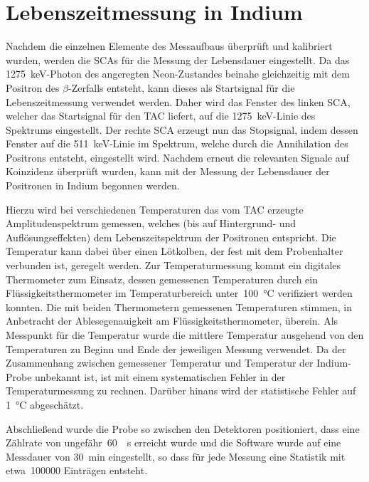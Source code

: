 \documentclass[11pt, a4paper]{article}
\numberwithin{equation}{section}
\begin{document}
\clearpage
\section{Lebenszeitmessung in Indium}
Nachdem die einzelnen Elemente des Messaufbaus überprüft und kalibriert wurden, werden die SCAs für die Messung der Lebensdauer eingestellt.
Da das \SI{1275}{\keV}-Photon des angeregten Neon-Zustandes beinahe gleichzeitig mit dem Positron des $\beta$-Zerfalls entsteht, kann dieses als Startsignal für die Lebenszeitmessung verwendet werden.
Daher wird das Fenster des linken SCA, welcher das Startsignal für den TAC liefert, auf die \SI{1275}{\keV}-Linie des Spektrums eingestellt.
Der rechte SCA erzeugt nun das Stopsignal, indem dessen Fenster auf die \SI{511}{\keV}-Linie im Spektrum, welche durch die Annihilation des Positrons entsteht, eingestellt wird.
Nachdem erneut die relevanten Signale auf Koinzidenz überprüft wurden, kann mit der Messung der Lebensdauer der Positronen in Indium begonnen werden.

Hierzu wird bei verschiedenen Temperaturen das vom TAC erzeugte Amplitudenspektrum gemessen, welches (bis auf Hintergrund- und Auflösungseffekten) dem Lebenszeitspektrum der Positronen entspricht.
Die Temperatur kann dabei über einen Lötkolben, der fest mit dem Probenhalter verbunden ist, geregelt werden.
Zur Temperaturmessung kommt ein digitales Thermometer zum Einsatz, dessen gemessenen Temperaturen durch ein Flüssigkeitsthermometer im Temperaturbereich unter~\SI{100}{\degreeCelsius} verifiziert werden konnten.
Die mit beiden Thermometern gemessenen Temperaturen stimmen, in Anbetracht der Ablesegenauigkeit am Flüssigkeitsthermometer, überein.
Als Messpunkt für die Temperatur wurde die mittlere Temperatur ausgehend von den Temperaturen zu Beginn und Ende der jeweiligen Messung verwendet.
Da der Zusammenhang zwischen gemessener Temperatur und Temperatur der Indium-Probe unbekannt ist, ist mit einem systematischen Fehler in der Temperaturmessung zu rechnen.
Darüber hinaus wird der statistische Fehler auf \SI{1}{\degreeCelsius} abgeschätzt.

Abschließend wurde die Probe so zwischen den Detektoren positioniert, dass eine Zählrate von ungefähr~\SI{60}{\per\second} erreicht wurde und die Software wurde auf eine Messdauer von \SI{30}{min} eingestellt, so dass für jede Messung eine Statistik mit etwa~\num{100000} Einträgen entsteht.
\end{document}
